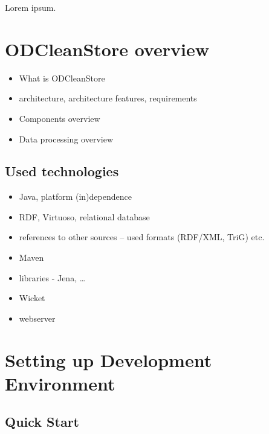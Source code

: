 
\newcommand{\version}{0.3.1}
\newcommand{\documentname}{\refprogrammersguide}






\renewcommand{\contentsname}{Contents}
\tableofcontents
\bigskip

\newpage


Lorem ipsum.


\chapter{ODCleanStore overview} 

\begin{itemize}
	\item What is ODCleanStore
	\item architecture, architecture features, requirements
	\item Components overview
	\item Data processing overview
\end{itemize}

\section{Used technologies}


\begin{itemize}
	\item Java, platform (in)dependence
	\item RDF, Virtuoso, relational database
	\item references to other sources -- used formats (RDF/XML, TriG) etc.
	\item Maven
	\item libraries - Jena, \ldots
	\item Wicket
	\item webserver
\end{itemize}

\chapter{Setting up Development Environment}

\section{Quick Start}
